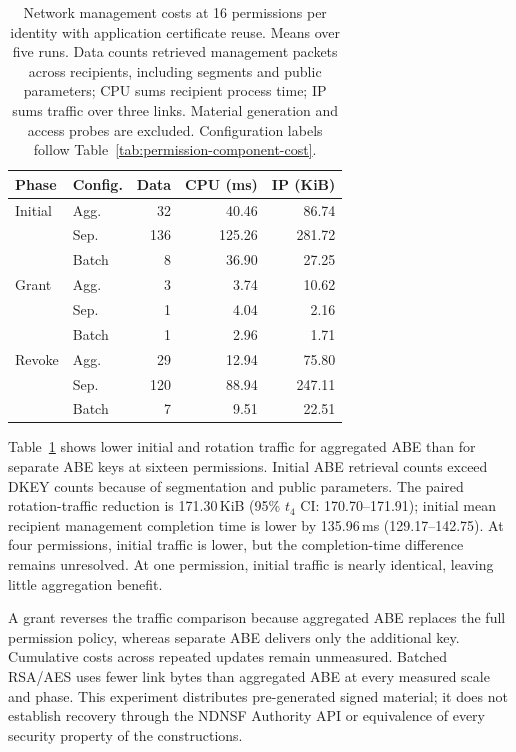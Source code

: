 \begin{table}[t]
\centering
\caption{Network management costs at 16 permissions per identity with application certificate reuse. Means over five runs. Data counts retrieved management packets across recipients, including segments and public parameters; CPU sums recipient process time; IP sums traffic over three links. Material generation and access probes are excluded. Configuration labels follow Table~\ref{tab:permission-component-cost}.}
\label{tab:permission-network-cost}
\footnotesize
\begin{tabular}{llrrr}
\toprule
Phase & Config. & Data & CPU (ms) & IP (KiB) \\
\midrule
Initial & Agg. & 32 & 40.46 & 86.74 \\
 & Sep. & 136 & 125.26 & 281.72 \\
 & Batch & 8 & 36.90 & 27.25 \\
Grant & Agg. & 3 & 3.74 & 10.62 \\
 & Sep. & 1 & 4.04 & 2.16 \\
 & Batch & 1 & 2.96 & 1.71 \\
Revoke & Agg. & 29 & 12.94 & 75.80 \\
 & Sep. & 120 & 88.94 & 247.11 \\
 & Batch & 7 & 9.51 & 22.51 \\
\bottomrule
\end{tabular}
\end{table}

Table~\ref{tab:permission-network-cost} shows lower initial and rotation traffic for aggregated ABE than for separate ABE keys at sixteen permissions. Initial ABE retrieval counts exceed DKEY counts because of segmentation and public parameters. The paired rotation-traffic reduction is 171.30\,KiB (95\% $t_4$ CI: 170.70--171.91); initial mean recipient management completion time is lower by 135.96\,ms (129.17--142.75). At four permissions, initial traffic is lower, but the completion-time difference remains unresolved. At one permission, initial traffic is nearly identical, leaving little aggregation benefit.

A grant reverses the traffic comparison because aggregated ABE replaces the full permission policy, whereas separate ABE delivers only the additional key. Cumulative costs across repeated updates remain unmeasured. Batched RSA/AES uses fewer link bytes than aggregated ABE at every measured scale and phase. This experiment distributes pre-generated signed material; it does not establish recovery through the NDNSF Authority API or equivalence of every security property of the constructions.

